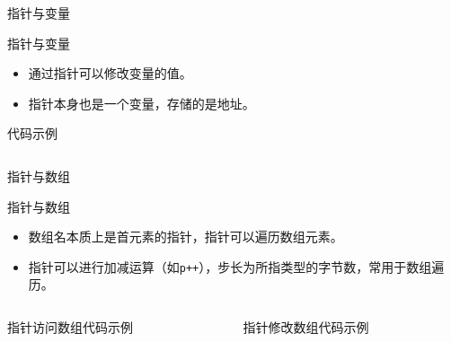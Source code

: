 \documentclass[UTF8,aspectratio=169]{beamer}
\begin{document}
\begin{frame}{指针与变量}
    \begin{ytublock}{指针与变量}
        \begin{itemize}
            \item 通过指针可以修改变量的值。
            \item 指针本身也是一个变量，存储的是地址。
        \end{itemize}
    \end{ytublock}
    \begin{ytublock}{代码示例}
        \inputminted[firstline=9,lastline=20]{cpp}{code/c_pointer_example.c}
    \end{ytublock}
\end{frame}

\begin{frame}{指针与数组}
    \begin{ytublock}{指针与数组}
        \begin{itemize}
            \item 数组名本质上是首元素的指针，指针可以遍历数组元素。
            \item 指针可以进行加减运算（如\texttt{p++}），步长为所指类型的字节数，常用于数组遍历。
        \end{itemize}
    \end{ytublock}
    \begin{columns}
        \begin{column}{0.48\textwidth}
    \begin{ytublock}{指针访问数组代码示例}
        \inputminted[firstline=22,lastline=30]{cpp}{code/c_pointer_example.c}
    \end{ytublock}
    \end{column}
    \begin{column}{0.48\textwidth}
        \begin{ytublock}{指针修改数组代码示例}
            \inputminted[firstline=32,lastline=38]{cpp}{code/c_pointer_example.c}
        \end{ytublock}
    \end{column}
    \end{columns}
\end{frame}
\end{document}
